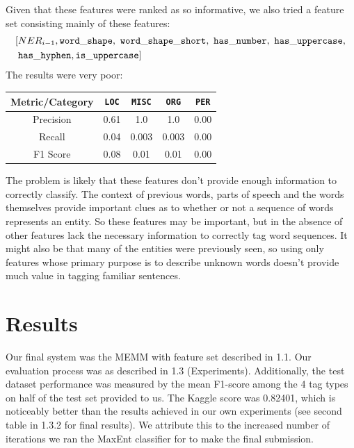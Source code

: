 \documentclass[12pt]{article}
\begin{document}
Given that these features were ranked as so informative, we also tried a feature set consisting mainly of these features: 
\begin{equation*}
\begin{split}
[
&NER_{i - 1}, {\tt word\_shape,\ word\_shape\_short,\ has\_number,\ has\_uppercase,}\\
&{\tt has\_hyphen, is\_uppercase}
]
\end{split}
\end{equation*}
The results were very poor:
\begin{center}
	\begin{tabular}{|c|c|c|c|c|}
		\hline
		\textbf{Metric/Category} & {\tt LOC} & {\tt MISC} & {\tt ORG} & {\tt PER}\\
		\hline
		Precision & 0.61 & 1.0 & 1.0 & 0.00\\
		\hline
		Recall & 0.04 & 0.003 & 0.003 & 0.00\\
		\hline
		F1 Score & 0.08 & 0.01 & 0.01 & 0.00\\
		\hline
	\end{tabular}
\end{center}
The problem is likely that these features don't provide enough information to correctly classify. The context of previous words, parts of speech and the words themselves provide important clues as to whether or not a sequence of words represents an entity. So these features may be important, but in the absence of other features lack the necessary information to correctly tag word sequences. It might also be that many of the entities were previously seen, so using only features whose primary purpose is to describe unknown words doesn't provide much value in tagging familiar sentences. 

\section{Results}
Our final system was the MEMM with feature set described in 1.1. Our evaluation process was as described in 1.3 (Experiments). Additionally, the test dataset performance was measured by the mean F1-score among the 4 tag types on half of the test set provided to us. The Kaggle score was 0.82401, which is noticeably better than the results achieved in our own experiments (see second table in 1.3.2 for final results). We attribute this to the increased number of iterations we ran the MaxEnt classifier for to make the final submission. 
\end{document}
